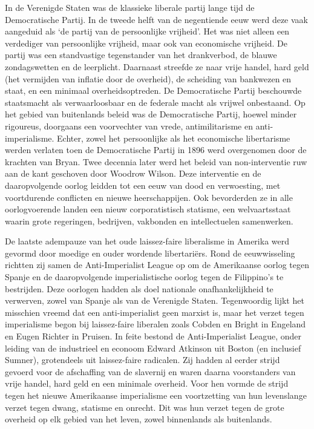 \documentclass[
  a5paper,
  smalldemyvopaper,10pt,twoside,onecolumn,openright,extrafontsizes,hidelinks]{memoir}
\begin{document}
In de Verenigde Staten was de klassieke liberale partij lange tijd de
Democratische Partij. In de tweede helft van de negentiende eeuw werd
deze vaak aangeduid als `de partij van de persoonlijke vrijheid'. Het
was niet alleen een verdediger van persoonlijke vrijheid, maar ook van
economische vrijheid. De partij was een standvastige tegenstander van
het drankverbod, de blauwe zondagswetten en de leerplicht. Daarnaast
streefde ze naar vrije handel, hard geld (het vermijden van inflatie
door de overheid), de scheiding van bankwezen en staat, en een minimaal
overheidsoptreden. De Democratische Partij beschouwde staatsmacht als
verwaarloosbaar en de federale macht als vrijwel onbestaand. Op het
gebied van buitenlands beleid was de Democratische Partij, hoewel minder
rigoureus, doorgaans een voorvechter van vrede, antimilitarisme en
anti-imperialisme. Echter, zowel het persoonlijke als het economische
libertarisme werden verlaten toen de Democratische Partij in 1896 werd
overgenomen door de krachten van Bryan. Twee decennia later werd het
beleid van non-interventie ruw aan de kant geschoven door Woodrow
Wilson. Deze interventie en de daaropvolgende oorlog leidden tot een
eeuw van dood en verwoesting, met voortdurende conflicten en nieuwe
heerschappijen. Ook bevorderden ze in alle oorlogvoerende landen een
nieuw corporatistisch statisme, een welvaartsstaat waarin grote
regeringen, bedrijven, vakbonden en intellectuelen samenwerken.

De laatste adempauze van het oude laissez-faire liberalisme in Amerika
werd gevormd door moedige en ouder wordende libertariërs. Rond de
eeuwwisseling richtten zij samen de Anti-Imperialist League op om de
Amerikaanse oorlog tegen Spanje en de daaropvolgende imperialistische
oorlog tegen de Filippino's te bestrijden. Deze oorlogen hadden als doel
nationale onafhankelijkheid te verwerven, zowel van Spanje als van de
Verenigde Staten. Tegenwoordig lijkt het misschien vreemd dat een
anti-imperialist geen marxist is, maar het verzet tegen imperialisme
begon bij laissez-faire liberalen zoals Cobden en Bright in Engeland en
Eugen Richter in Pruisen. In feite bestond de Anti-Imperialist League,
onder leiding van de industrieel en econoom Edward Atkinson uit Boston
(en inclusief Sumner), grotendeels uit laissez-faire radicalen. Zij
hadden al eerder strijd gevoerd voor de afschaffing van de slavernij en
waren daarna voorstanders van vrije handel, hard geld en een minimale
overheid. Voor hen vormde de strijd tegen het nieuwe Amerikaanse
imperialisme een voortzetting van hun levenslange verzet tegen dwang,
statisme en onrecht. Dit was hun verzet tegen de grote overheid op elk
gebied van het leven, zowel binnenlands als buitenlands.
\end{document}
